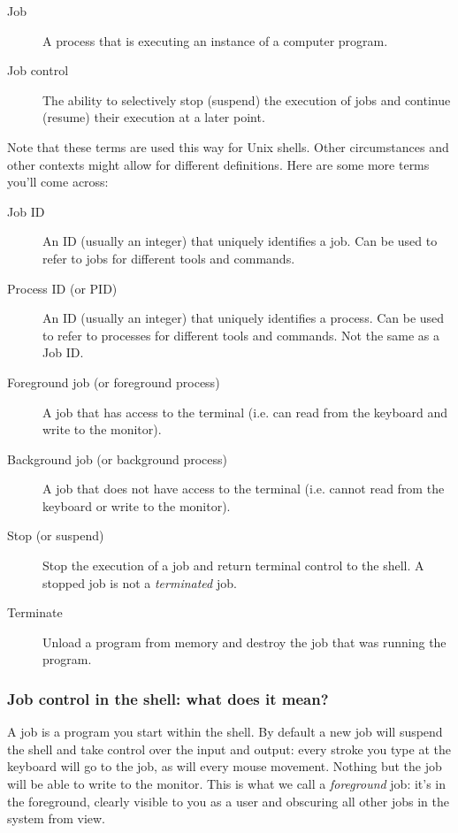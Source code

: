 \begin{description}
\item[Job] A process that is executing an instance of a computer program.
\item[Job control] The ability to selectively stop (suspend) the execution of jobs and continue (resume) their execution at a later point.
\end{description}

Note that these terms are used this way for Unix shells. Other circumstances
and other contexts might allow for different definitions. Here are some more
terms you'll come across:

\begin{description}
\item[Job ID] An ID (usually an integer) that uniquely identifies a job. Can be used to refer to jobs for different tools and commands.
\item[Process ID (or PID)] An ID (usually an integer) that uniquely identifies a process. Can be used to refer to processes for different tools and commands. Not the same as a Job ID.
\item[Foreground job (or foreground process)] A job that has access to the terminal (i.e. can read from the keyboard and write to the monitor).
\item[Background job (or background process)] A job that does not have access to the terminal (i.e. cannot read from the keyboard or write to the monitor).
\item[Stop (or suspend)] Stop the execution of a job and return terminal control to the shell. A stopped job is not a \textit{terminated} job.
\item[Terminate] Unload a program from memory and destroy the job that was running the program.
\end{description}

\subsubsection{Job control in the shell: what does it mean?}
A job is a program you start within the shell. By default a new job will
suspend the shell and take control over the input and output: every stroke you
type at the keyboard will go to the job, as will every mouse movement. Nothing
but the job will be able to write to the monitor. This is what we call a
\textit{foreground} job: it's in the foreground, clearly visible to you as a
user and obscuring all other jobs in the system from view.

